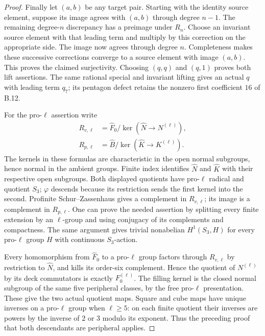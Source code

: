 \begin{proof}
Finally let $(a,b)$ be any target pair. Starting with the
identity source element, suppose its image agrees with
$(a,b)$ through degree $n-1$. The remaining degree-$n$
discrepancy has a preimage under $R_n$. Choose an invariant
source element with that leading term and multiply by this
correction on the appropriate side. The image now agrees
through degree $n$. Completeness makes these successive
corrections converge to a source element with image
$(a,b)$. This proves the claimed surjectivity. Choosing
$(q,q)$ and $(q,1)$ proves both lift assertions. The same
rational special and invariant lifting gives an actual
$q$ with leading term $q_7$; its pentagon defect retains
the nonzero first coefficient $16$ of B.12.

For the pro-$\ell$ assertion write
\[
 \begin{aligned}
 R_{v,\ell}&=\widehat F_0/
        \ker(\widehat N\longrightarrow N^{(\ell)}),\\
 R_{p,\ell}&=\widehat B/
        \ker(\widehat K\longrightarrow K^{(\ell)}).
 \end{aligned}
\]
The kernels in these formulas are characteristic in the
open normal subgroups, hence normal in the ambient groups.
Finite index identifies $\widehat N$ and $\widehat K$
with their respective open subgroups. Both displayed
quotients have pro-$\ell$ radical and quotient $S_3$;
$\varphi$ descends because its restriction sends the first
kernel into the second. Profinite Schur--Zassenhaus gives
a complement in $R_{v,\ell}$; its image is a complement
in $R_{p,\ell}$. One can prove the needed assertion by
splitting every finite extension by an $\ell$-group and
using conjugacy of its complements and compactness. The
same argument gives trivial nonabelian $H^1(S_3,H)$ for
every pro-$\ell$ group $H$ with continuous $S_3$-action.

Every homomorphism from $\widehat F_0$ to a pro-$\ell$
group factors through $R_{v,\ell}$ by restriction to
$\widehat N$, and kills its order-six complement. Hence
the quotient of $N^{(\ell)}$ by its deck commutators is
exactly $F_0^{(\ell)}$. The filling kernel is the closed
normal subgroup of the same five peripheral classes, by
the free pro-$\ell$ presentation. These give the two
actual quotient maps. Square and cube maps have unique
inverses on a pro-$\ell$ group when $\ell\ge5$: on each
finite quotient their inverses are powers by the inverse
of $2$ or $3$ modulo its exponent. Thus the preceding
proof that both descendants are peripheral applies.


\end{proof}
